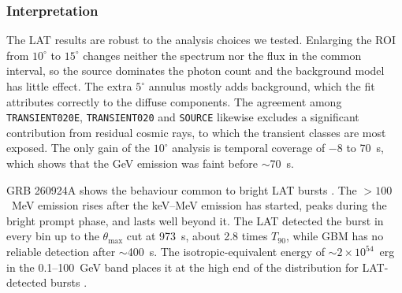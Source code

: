 \subsubsection{Interpretation}
\label{sec:lat:discussion}

The LAT results are robust to the analysis choices we tested. Enlarging the ROI from $10^\circ$ to $15^\circ$
changes neither the spectrum nor the flux in the common interval, so the source dominates the photon count and the
background model has little effect. The extra $5^\circ$ annulus mostly adds background, which the fit attributes
correctly to the diffuse components. The agreement among \texttt{TRANSIENT020E}, \texttt{TRANSIENT020} and
\texttt{SOURCE} likewise excludes a significant contribution from residual cosmic rays, to which the transient
classes are most exposed. The only gain of the $10^\circ$ analysis is temporal coverage of $-8$ to 70~s, which shows
that the GeV emission was faint before $\sim$70~s.

GRB 260924A shows the behaviour common to bright LAT bursts \citep{Ajello2019}. The $>100$~MeV emission rises after
the keV--MeV emission has started, peaks during the bright prompt phase, and lasts well beyond it. The LAT
detected the burst in every bin up to the $\theta_{\max}$ cut at 973~s, about 2.8 times $T_{90}$, while GBM has
no reliable detection after $\sim$400~s. The isotropic-equivalent energy of $\sim2\times10^{54}$~erg in the
0.1--100~GeV band places it at the high end of the distribution for LAT-detected bursts \citep{Ajello2019}.

